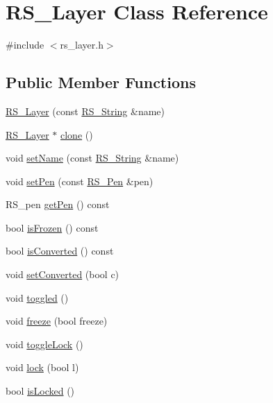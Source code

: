 \hypertarget{class_r_s___layer}{\section{R\-S\-\_\-\-Layer Class Reference}
\label{class_r_s___layer}
}


{\ttfamily \#include $<$rs\-\_\-layer.\-h$>$}

\subsection*{Public Member Functions}
\begin{DoxyCompactItemize}
\item 
\hyperlink{class_r_s___layer_ad09eb200015e78d3a5fda3e5a8302e2e}{R\-S\-\_\-\-Layer} (const \hyperlink{rs__string_8h_a5adec11f318c2ae2ecdc6fe2b03be9fa}{R\-S\-\_\-\-String} \&name)
\item 
\hyperlink{class_r_s___layer}{R\-S\-\_\-\-Layer} $\ast$ \hyperlink{class_r_s___layer_ad3ae3c4541f7d0024d5a00203c4d92be}{clone} ()
\item 
void \hyperlink{class_r_s___layer_ad893a790a624c7166dcb6333fbcd6422}{set\-Name} (const \hyperlink{rs__string_8h_a5adec11f318c2ae2ecdc6fe2b03be9fa}{R\-S\-\_\-\-String} \&name)
\item 
void \hyperlink{class_r_s___layer_ac5be377e1a80e3e19f12ba7b9dfc5fc8}{set\-Pen} (const \hyperlink{class_r_s___pen}{R\-S\-\_\-\-Pen} \&pen)
\item 
R\-S\-\_\-pen \hyperlink{class_r_s___layer_ac9e0da99df39f8a0f76cee94e994f1a8}{get\-Pen} () const 
\item 
bool \hyperlink{class_r_s___layer_a4bac277cb1e988be074d2850ef9b7cce}{is\-Frozen} () const 
\item 
bool \hyperlink{class_r_s___layer_a13d3a2fec12c4b3082f1ad5f0f33a2fc}{is\-Converted} () const 
\item 
void \hyperlink{class_r_s___layer_a5ff9c824b2c6d22cff58d0e7fe7c22d6}{set\-Converted} (bool c)
\item 
void \hyperlink{class_r_s___layer_a572f42428b321bd20cfa8cbb2ba84453}{toggled} ()
\item 
void \hyperlink{class_r_s___layer_a9a8140a09260cd97508af31016ced14a}{freeze} (bool freeze)
\item 
void \hyperlink{class_r_s___layer_a201e3d60c9c2098edca71316a1c4d463}{toggle\-Lock} ()
\item 
void \hyperlink{class_r_s___layer_a10191b7f9abd3706bfc76fc961b3bfd9}{lock} (bool l)
\item 
bool \hyperlink{class_r_s___layer_a9d78b6003d8ce252ef7cd6c309f14770}{is\-Locked} ()
\end{DoxyCompactItemize}
